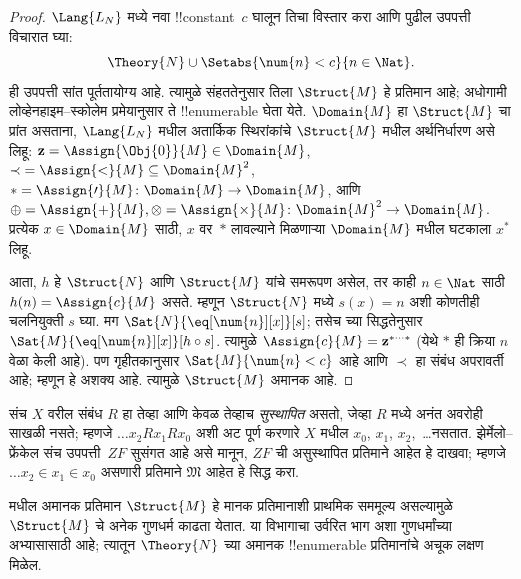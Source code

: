 \documentclass[../../../include/open-logic-section]{subfiles}
\begin{document}
\begin{proof}
$\Lang{L_N}$ मध्ये नवा !!{constant}~$c$ घालून तिचा विस्तार करा
आणि पुढील उपपत्ती विचारात घ्या:
\[
\Theory{N} \cup \Setabs{\num{n} < c}{n \in \Nat}.
\]
ही उपपत्ती सांत पूर्ततायोग्य आहे. त्यामुळे संहततेनुसार तिला
$\Struct{M}$ हे प्रतिमान आहे; अधोगामी लोव्हेनहाइम--स्कोलेम
प्रमेयानुसार ते !!{enumerable} घेता येते. $\Domain{M}$ हा
$\Struct{M}$ चा प्रांत असताना, $\Lang{L_N}$ मधील अतार्किक
स्थिरांकांचे $\Struct{M}$ मधील अर्थनिर्धारण असे लिहू:
$\mathbf{z} = \Assign{\Obj{0}}{M} \in \Domain{M}$,
${\prec} = \Assign{<}{M} \subseteq \Domain{M}^2$,
$* = \Assign{\prime}{M} \colon \Domain{M} \to \Domain{M}$,
आणि $\oplus = \Assign{+}{M}, \otimes =
\Assign{\times}{M} \colon \Domain{M}^2 \to \Domain{M}$.
प्रत्येक $x \in \Domain{M}$ साठी, $x$ वर~$*$ लावल्याने
मिळणाऱ्या $\Domain{M}$ मधील घटकाला $x^*$ लिहू.

आता, $h$ हे $\Struct{N}$ आणि $\Struct{M}$ यांचे
समरूपण असेल, तर काही $n \in \Nat$ साठी
$h(n) = \Assign{c}{M}$ असते. म्हणून $\Struct{N}$ मध्ये
$s(x) = n$ अशी कोणतीही चलनियुक्ती $s$ घ्या. मग
$\Sat{N}{\eq[\num{n}][x]}[s]$; तसेच
 च्या सिद्धतेनुसार
$\Sat{M}{\eq[\num{n}][x]}[h \circ s]$.
त्यामुळे $\Assign{c}{M} = \mathbf{z}^{*\cdots *}$
(येथे $*$ ही क्रिया $n$ वेळा केली आहे).
पण गृहीतकानुसार $\Sat{M}{\num{n} < c}$ आहे आणि
$\prec$ हा संबंध अपरावर्ती आहे; म्हणून हे अशक्य आहे.
त्यामुळे $\Struct{M}$ अमानक आहे.
\end{proof}

\begin{prob}
संच $X$ वरील संबंध $R$ हा तेव्हा आणि केवळ तेव्हाच
\emph{सुस्थापित} असतो, जेव्हा $R$ मध्ये अनंत अवरोही साखळी
नसते; म्हणजे $\dots x_2Rx_1Rx_0$ अशी अट पूर्ण करणारे
$X$ मधील $x_0$, $x_1$, $x_2$,~\dots नसतात.
झेर्मेलो--फ्रेंकेल संच उपपत्ती~$ZF$ सुसंगत आहे असे मानून,
$ZF$ ची असुस्थापित प्रतिमाने आहेत हे दाखवा; म्हणजे
$\dots x_2 \in x_1 \in x_0$ असणारी प्रतिमाने
$\mathfrak{M}$ आहेत हे सिद्ध करा.
\end{prob}

 मधील अमानक प्रतिमान
$\Struct{M}$ हे मानक प्रतिमानाशी प्राथमिक सममूल्य असल्यामुळे
$\Struct{M}$ चे अनेक गुणधर्म काढता येतात. या विभागाचा
उर्वरित भाग अशा गुणधर्मांच्या अभ्यासासाठी आहे; त्यातून
$\Theory{N}$ च्या अमानक !!{enumerable} प्रतिमानांचे
अचूक लक्षण मिळेल.
\end{document}
